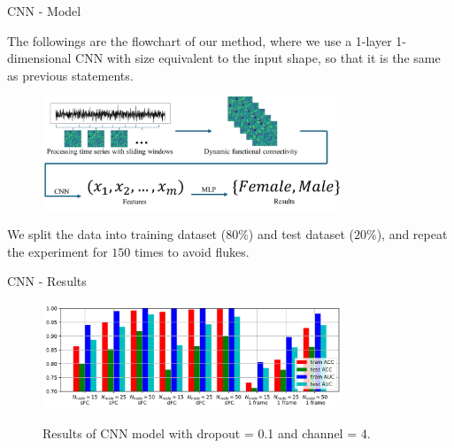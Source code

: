 \documentclass{beamer}
\begin{document}
\begin{frame}{CNN - Model}

    The followings are the flowchart of our method, where we use a 1-layer 1-dimensional CNN with size equivalent to the input shape, so that it is the same as previous statements.

    \begin{figure}[H]
        \centering
        \includegraphics[width=0.8\textwidth]{./figure/method.png}
    \end{figure}

    We split the data into training dataset ($80\%$) and test dataset ($20\%$), and repeat the experiment for $150$ times to avoid flukes.

\end{frame}

\begin{frame}{CNN - Results}

    \begin{figure}[H]
        \centering
        \includegraphics[width=0.8\textwidth]{../output_1/bar_channel=4_dropout=0.1.jpg} \\
        \caption{Results of CNN model with dropout = 0.1 and channel = 4.}
    \end{figure}

\end{frame}
\end{document}
